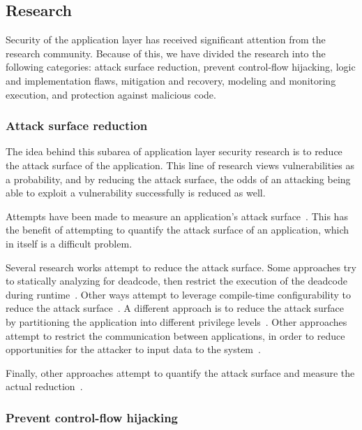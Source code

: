 \documentclass[11pt,letterpaper]{article}
\begin{document}
\subsection{Research}

Security of the application layer has received significant attention
from the research community. Because of this, we have divided the
research into the following categories: attack surface reduction, prevent control-flow
hijacking, logic and implementation flaws, mitigation and recovery,
modeling and monitoring execution, and protection against malicious
code.

\subsubsection{Attack surface reduction}

The idea behind this subarea of application layer security research is
to reduce the attack surface of the application. This line of research
views vulnerabilities as a probability, and by reducing the attack
surface, the odds of an attacking being able to exploit a
vulnerability successfully is reduced as well.

Attempts have been made to measure an application's attack
surface~\cite{Howard2003, Manadhata2007, Manadhata2008, Ruprecht2014}.
This has the benefit of attempting to quantify the attack surface of
an application, which in itself is a difficult problem.

Several research works attempt to reduce the attack surface. Some
approaches try to statically analyzing for deadcode, then restrict the
execution of the deadcode during runtime~\cite{Kurmus2011}. Other ways
attempt to leverage compile-time configurability to reduce the attack
surface~\cite{Tartler2012, Kurmus2013, Ruprecht2014}. A different
approach is to reduce the attack surface by partitioning the
application into different privilege levels~\cite{Barth2010, Xu2012}.
Other approaches attempt to restrict the communication between
applications, in order to reduce opportunities for the attacker to
input data to the system~\cite{Kantola2012}.

Finally, other approaches attempt to quantify the attack surface and
measure the actual reduction~\cite{Kurmus2014}.

\subsubsection{Prevent control-flow hijacking}
\end{document}
